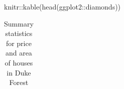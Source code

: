\documentclass[
  spanish,
  12pt,
  letterpaper,
  DIV=11,
  numbers=noendperiod]{scrreprt}
\newenvironment{Shaded}{\begin{snugshade}}{\end{snugshade}}
\newcommand{\FunctionTok}[1]{\textcolor[rgb]{0.28,0.35,0.67}{#1}}
\newcommand{\NormalTok}[1]{\textcolor[rgb]{0.00,0.23,0.31}{#1}}
\newcommand{\SpecialCharTok}[1]{\textcolor[rgb]{0.37,0.37,0.37}{#1}}
\begin{document}
\begin{Shaded}
\begin{Highlighting}[]
\NormalTok{knitr}\SpecialCharTok{::}\FunctionTok{kable}\NormalTok{(}\FunctionTok{head}\NormalTok{(ggplot2}\SpecialCharTok{::}\NormalTok{diamonds))}
\end{Highlighting}
\end{Shaded}

{

\begin{longtable}[]{@{}
  >{\raggedleft\arraybackslash}p{}
  >{\raggedright\arraybackslash}p{}
  >{\raggedright\arraybackslash}p{}
  >{\raggedright\arraybackslash}p{}
  >{\raggedleft\arraybackslash}p{}
  >{\raggedleft\arraybackslash}p{}
  >{\raggedleft\arraybackslash}p{}
  >{\raggedleft\arraybackslash}p{}
  >{\raggedleft\arraybackslash}p{}
  >{\raggedleft\arraybackslash}p{}@{}}

\caption{\label{tbl-stats}Summary statistics for price and area of
houses in Duke Forest}

\tabularnewline


\end{longtable}}
\end{document}
